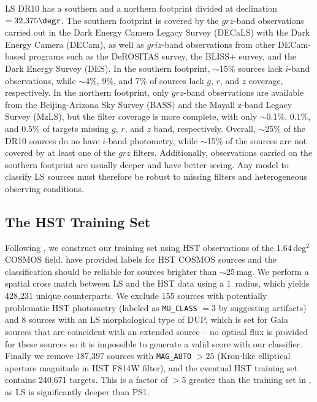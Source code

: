\documentclass[twocolumn,tighten]{aastex631}
\newcommand{\dr}[1]{DR{#1}}
\begin{document}
\begin{CJK*}{UTF8}{gbsn}
LS \dr{10} has a southern and a northern footprint divided at declination $=32.375\degr$. The southern footprint is covered by the 
$grz$-band observations carried out in the Dark Energy Camera Legacy Survey (DECaLS) with the Dark Energy Camera (DECam), as well as $griz$-band observations from other DECam-based programs such as the DeROSITAS survey, the BLISS+ survey, and the Dark Energy Survey (DES). In the southern footprint, $\sim$15\% sources lack $i$-band observations, while $\sim$4\%, 9\%, and 7\% of sources lack $g$, $r$, and $z$ coverage, respectively. In the northern footprint, only $grz$-band observations are available from the Beijing-Arizona Sky Survey (BASS) and the Mayall z-band Legacy Survey (MzLS), but the filter coverage is more complete, with only $\sim$0.1\%, 0.1\%, and 0.5\% of targets missing $g$, $r$, and $z$ band, respectively. Overall, $\sim$25\% of the \dr{10} sources do no have $i$-band photometry, while $\sim$15\% of the sources are not covered by at least one of the $grz$ filters. Additionally, observations carried on the southern footprint are usually deeper and have better seeing. Any model to classify LS sources must therefore be robust to missing filters and heterogeneous observing conditions.

\subsection{The HST Training Set}\label{sec:HST}
Following , we construct our training set using HST observations of the 1.64\,deg$^2$ COSMOS field. \cite{Leauthaud_2007} have provided labels for HST COSMOS sources and the classification should be reliable for sources brighter than $\sim$25\,mag. We perform a spatial cross match between LS and the HST data using a 1\arcsec\ radius, which yields 428,231 unique counterparts. We exclude 155 sources with potentially problematic HST photometry (labeled as \texttt{MU\_CLASS} $=3$ by \citealp{Leauthaud_2007} suggesting artifacts) and 8 sources with an LS morphological type of DUP, which is set for Gaia sources that are coincident with an extended source -- no optical flux is provided for these sources so it is impossible to generate a valid score with our classifier. Finally we remove 187,397 sources with \texttt{MAG\_AUTO} $>25$ (Kron-like elliptical aperture magnitude in HST F814W filter), and the eventual HST training set contains 240,671 targets. This is a factor of $>$5 greater than the training set in , as LS is significantly deeper than PS1.


\end{CJK*}
\end{document}
